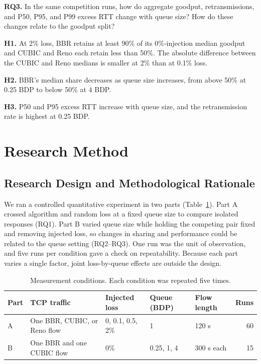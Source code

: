 \documentclass[11pt,a4paper]{article}
\begin{document}
\textbf{RQ3.} In the same competition runs, how do aggregate goodput, retransmissions, and P50, P95, and P99 excess RTT change with queue size? How do these changes relate to the goodput split?

\textbf{H1.} At 2\% loss, BBR retains at least 90\% of its 0\%-injection median goodput and CUBIC and Reno each retain less than 50\%. The absolute difference between the CUBIC and Reno medians is smaller at 2\% than at 0.1\% loss.

\textbf{H2.} BBR's median share decreases as queue size increases, from above 50\% at 0.25 BDP to below 50\% at 4 BDP.

\textbf{H3.} P50 and P95 excess RTT increase with queue size, and the retransmission rate is highest at 0.25 BDP.
\par
\endgroup

\clearpage

\section{Research Method}

\subsection{Research Design and Methodological Rationale}

We ran a controlled quantitative experiment in two parts (Table~\ref{tab:design}). Part A crossed algorithm and random loss at a fixed queue size to compare isolated responses (RQ1). Part B varied queue size while holding the competing pair fixed and removing injected loss, so changes in sharing and performance could be related to the queue setting (RQ2--RQ3). One run was the unit of observation, and five runs per condition gave a check on repeatability. Because each part varies a single factor, joint loss-by-queue effects are outside the design.

\begin{table}[!htbp]
\centering
\caption{Measurement conditions. Each condition was repeated five times.}
\label{tab:design}
\begin{tabularx}{\linewidth}{@{}lXlll r@{}}
\toprule
Part & TCP traffic & Injected loss & Queue (BDP) & Flow length & Runs \\
\midrule
A & One BBR, CUBIC, or Reno flow & 0, 0.1, 0.5, 2\% & 1 & 120 s & 60 \\
B & One BBR and one CUBIC flow & 0\% & 0.25, 1, 4 & 300 s each & 15 \\
\bottomrule
\end{tabularx}
\end{table}
\end{document}
